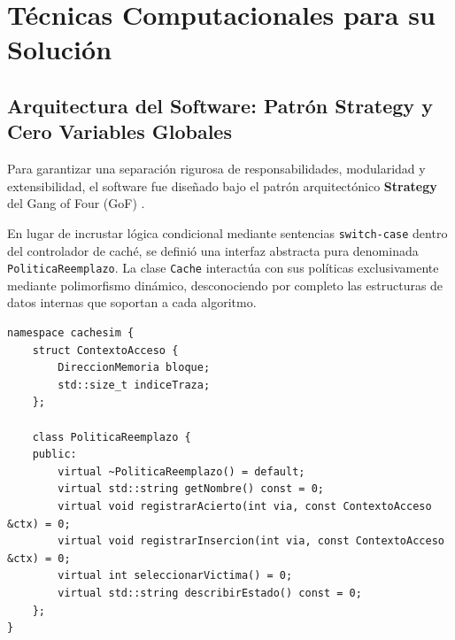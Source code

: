 \documentclass[11pt,letterpaper]{article}
\begin{document}
\newpage
\section{Técnicas Computacionales para su Solución}

\subsection{Arquitectura del Software: Patrón Strategy y Cero Variables Globales}
Para garantizar una separación rigurosa de responsabilidades, modularidad y extensibilidad, el software fue diseñado bajo el patrón arquitectónico \textbf{Strategy} del Gang of Four (GoF) \cite{gamma1995design}. 

En lugar de incrustar lógica condicional mediante sentencias \texttt{switch-case} dentro del controlador de caché, se definió una interfaz abstracta pura denominada \texttt{PoliticaReemplazo}. La clase \texttt{Cache} interactúa con sus políticas exclusivamente mediante polimorfismo dinámico, desconociendo por completo las estructuras de datos internas que soportan a cada algoritmo.

\begin{lstlisting}[caption={Interfaz abstracta polimórfica \texttt{PoliticaReemplazo} en C++17.}, label={lst:strategy}]
namespace cachesim {
    struct ContextoAcceso {
        DireccionMemoria bloque;
        std::size_t indiceTraza;
    };

    class PoliticaReemplazo {
    public:
        virtual ~PoliticaReemplazo() = default;
        virtual std::string getNombre() const = 0;
        virtual void registrarAcierto(int via, const ContextoAcceso &ctx) = 0;
        virtual void registrarInsercion(int via, const ContextoAcceso &ctx) = 0;
        virtual int seleccionarVictima() = 0;
        virtual std::string describirEstado() const = 0;
    };
}
\end{lstlisting}
\end{document}
